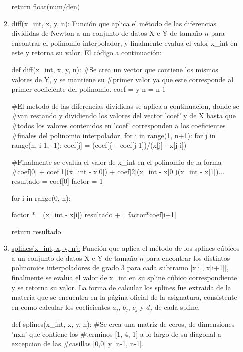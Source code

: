 \documentclass[letter, 10pt]{article}
\begin{document}
\begin{itemize}
\begin{enumerate}
\begin{python}
	return float(num/den)
\end{python}

\newpage

\item \underline{diff(x\_int, x, y, n):} Funci\'on que aplica el m\'etodo de las diferencias divididas de Newton a un conjunto de datos X e Y de tama\~no $n$ para encontrar el polinomio interpolador, y finalmente evalua el valor x\_int en este y retorna su valor. El c\'odigo a continuaci\'on:

\begin{python}
def diff(x_int, x, y, n):
#Se crea un vector que contiene los mismos valores de Y, y se mantiene su
#primer valor ya que este corresponde al primer coeficiente del polinomio.
    coef = y
    n = n-1

#El metodo de las diferencias divididas se aplica a continuacion, donde se
#van restando y dividiendo los valores del vector 'coef' y de X hasta que
#todos los valores contenidos en 'coef' corresponden a los coeficientes
#finales del polinomio interpolador.
    for i in range(1, n+1):
        for j in range(n, i-1, -1):
            coef[j] = (coef[j] - coef[j-1])/(x[j] - x[j-i])

#Finalmente se evalua el valor de x_int en el polinomio de la forma
#coef[0] + coef[1](x_int - x[0]) + coef[2](x_int - x[0])(x_int - x[1])...
    resultado = coef[0]
    factor = 1
    
    for i in range(0, n):
            
        factor *= (x_int - x[i])
        resultado += factor*coef[i+1]
    
    return resultado
\end{python}

\item \underline{splines(x\_int, x, y, n):} Funci\'on que aplica el m\'etodo de los splines c\'ubicos a un conjunto de datos X e Y de tama\~no $n$ para encontrar los distintos polinomios interpoladores de grado 3 para cada subtramo [x[i], x[i+1]], finalmente se evalua el valor de x\_int en su spline c\'ubico correspondiente y se retorna su valor. La forma de calcular los splines fue extraida de la materia que se encuentra en la p\'agina oficial de la asignatura, consistente en como calcular los coeficientes $a_j$, $b_j$, $c_j$ y  $d_j$  de cada spline.

\begin{python}
def splines(x_int, x, y, n):
#Se crea una matriz de ceros, de dimensiones 'nxn' que contiene los
#terminos [1, 4, 1] a lo largo de su diagonal a excepcion de las
#casillas [0,0] y [n-1, n-1].


\end{python}
\end{enumerate}
\end{itemize}
\end{document}
